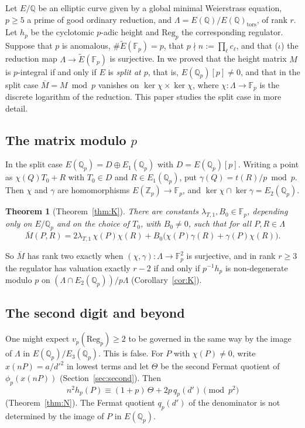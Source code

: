 \documentclass[11pt,a4paper]{amsart}
\newcommand{\Q}{\mathbb{Q}}
\newcommand{\Qp}{\mathbb{Q}_p}
\newcommand{\Zp}{\mathbb{Z}_p}
\newcommand{\Fp}{\mathbb{F}_p}
\newcommand{\Reg}{\mathrm{Reg}}
\newcommand{\Et}{\widetilde{E}}
\newcommand{\Lam}{\Lambda}
\newcommand{\qp}{q_p}
\newcommand{\Mb}{\overline{M}}
\theoremstyle{plain}
\newtheorem{theorem}{Theorem}[section]
\theoremstyle{definition}
\theoremstyle{remark}
\begin{document}
Let $E/\Q$ be an elliptic curve given by a global minimal Weierstrass equation, $p\ge5$ a prime of good ordinary reduction, and $\Lam=E(\Q)/E(\Q)_{\mathrm{tors}}$, of rank $r$. Let $h_p$ be the cyclotomic $p$-adic height and $\Reg_p$ the corresponding regulator. Suppose that $p$ is anomalous, $\#\Et(\Fp)=p$, that $p\nmid n:=\prod_\ell c_\ell$, and that ($\iota$) the reduction map $\Lam\to\Et(\Fp)$ is surjective. In \cite{P1} we proved that the height matrix $M$ is $p$-integral if and only if $E$ is \emph{split at $p$}, that is, $E(\Qp)[p]\ne0$, and that in the split case $\Mb=M\bmod p$ vanishes on $\ker\chi\times\ker\chi$, where $\chi\colon\Lam\to\Fp$ is the discrete logarithm of the reduction. This paper studies the split case in more detail.

\subsection{The matrix modulo $p$}
In the split case $E(\Qp)=D\oplus E_1(\Qp)$ with $D=E(\Qp)[p]$. Writing a point as $\chi(Q)T_0+R$ with $T_0\in D$ and $R\in E_1(\Qp)$, put $\gamma(Q)=t(R)/p\bmod p$. Then $\chi$ and $\gamma$ are homomorphisms $E(\Zp)\to\Fp$, and $\ker\chi\cap\ker\gamma=E_2(\Qp)$.

\begin{theorem}[Theorem~\ref{thm:K}]
There are constants $\lambda_{T,1},B_0\in\Fp$, depending only on $E/\Qp$ and on the choice of $T_0$, with $B_0\ne0$, such that for all $P,R\in\Lam$
\[
\Mb(P,R)=2\lambda_{T,1}\,\chi(P)\chi(R)+B_0\bigl(\chi(P)\gamma(R)+\gamma(P)\chi(R)\bigr).
\]
\end{theorem}

So $\Mb$ has rank two exactly when $(\chi,\gamma)\colon\Lam\to\Fp^2$ is surjective, and in rank $r\ge3$ the regulator has valuation exactly $r-2$ if and only if $p^{-1}h_p$ is non-degenerate modulo $p$ on $(\Lam\cap E_2(\Qp))/p\Lam$ (Corollary~\ref{cor:K}).

\subsection{The second digit and beyond}
One might expect $v_p(\Reg_p)\ge2$ to be governed in the same way by the image of $\Lam$ in $E(\Qp)/E_3(\Qp)$. This is false. For $P$ with $\chi(P)\ne0$, write $x(nP)=a/d'^2$ in lowest terms and let $\Theta$ be the second Fermat quotient of $\phi_p(x(nP))$ (Section~\ref{sec:second}). Then
\[
n^2h_p(P)\equiv(1+p)\,\Theta+2p\,\qp(d')\pmod{p^2}
\]
(Theorem~\ref{thm:N}). The Fermat quotient $\qp(d')$ of the denominator is not determined by the image of $P$ in $E(\Qp)$.
\end{document}
